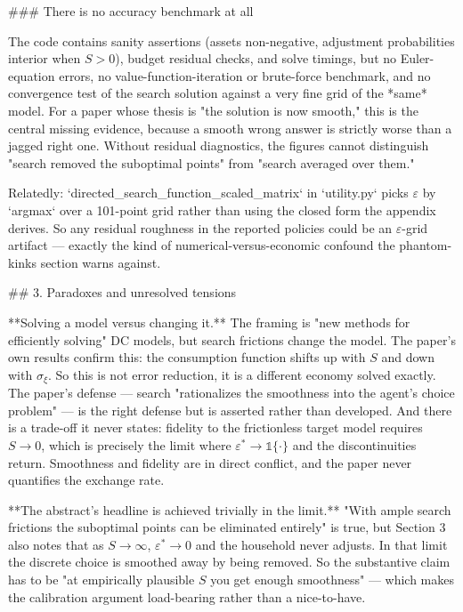 ### There is no accuracy benchmark at all

The code contains sanity assertions (assets non-negative, adjustment probabilities interior when $S>0$), budget residual checks, and solve timings, but no Euler-equation errors, no value-function-iteration or brute-force benchmark, and no convergence test of the search solution against a very fine grid of the *same* model. For a paper whose thesis is "the solution is now smooth," this is the central missing evidence, because a smooth wrong answer is strictly worse than a jagged right one. Without residual diagnostics, the figures cannot distinguish "search removed the suboptimal points" from "search averaged over them."

Relatedly: `directed_search_function_scaled_matrix` in `utility.py` picks $\varepsilon$ by `argmax` over a 101-point grid rather than using the closed form the appendix derives. So any residual roughness in the reported policies could be an $\varepsilon$-grid artifact — exactly the kind of numerical-versus-economic confound the phantom-kinks section warns against.

## 3. Paradoxes and unresolved tensions

**Solving a model versus changing it.** The framing is "new methods for efficiently solving" DC models, but search frictions change the model. The paper's own results confirm this: the consumption function shifts up with $S$ and down with $\sigma_\xi$. So this is not error reduction, it is a different economy solved exactly. The paper's defense — search "rationalizes the smoothness into the agent's choice problem" — is the right defense but is asserted rather than developed. And there is a trade-off it never states: fidelity to the frictionless target model requires $S\to 0$, which is precisely the limit where $\varepsilon^*\to\mathbb{1}\{\cdot\}$ and the discontinuities return. Smoothness and fidelity are in direct conflict, and the paper never quantifies the exchange rate.

**The abstract's headline is achieved trivially in the limit.** "With ample search frictions the suboptimal points can be eliminated entirely" is true, but Section 3 also notes that as $S\to\infty$, $\varepsilon^*\to 0$ and the household never adjusts. In that limit the discrete choice is smoothed away by being removed. So the substantive claim has to be "at empirically plausible $S$ you get enough smoothness" — which makes the calibration argument load-bearing rather than a nice-to-have.

